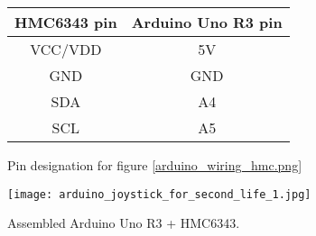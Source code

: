 


\begin{figure}[h]

\begin{minipage}{\linewidth}

\begin{center}
\begin{tabular}{| c | c |}

\hline	

\textbf{HMC6343 pin} & \textbf{Arduino Uno R3 pin} \\

\hline

VCC/VDD & 5V\vccFootnote{} \\

\hline

GND & GND \\

\hline

SDA & A4\itwocFootnote{} \\

\hline

SCL & A5 \\

\hline

\end{tabular}
\end{center}



\end{minipage}

\caption{Pin designation for figure \ref{arduino_wiring_hmc.png}}
\label{HMC6343wiringtable}
\end{figure}



\begin{figure}[h]
\centering
  \texttt{[image: arduino\_joystick\_for\_second\_life\_1.jpg]}
  \caption{Assembled Arduino Uno R3 + HMC6343.}
  \label{arduino_joystick_for_second_life_1.jpg}
\end{figure}

